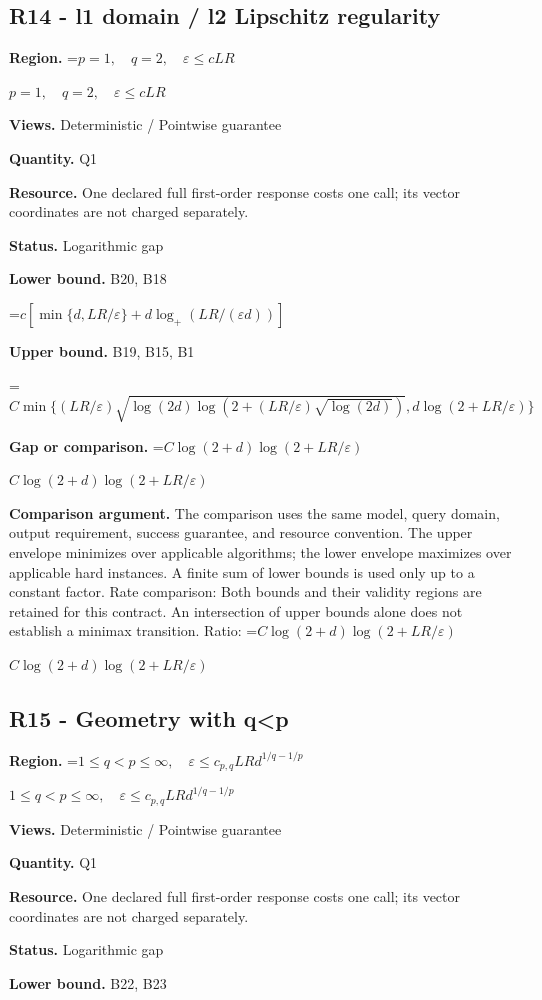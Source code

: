\documentclass[10pt,a4paper]{article}
\newcommand{\AtlasMath}[1]{\par\begingroup\centering\setbox0=\hbox{$\displaystyle #1$}\ifdim\wd0>1.4\linewidth\typeout{ATLAS WIDE FORMULA: \the\wd0}\fi\ifdim\wd0>\linewidth\resizebox{\linewidth}{!}{\box0}\else\box0\fi\par\endgroup}
\newcommand{\AtlasInlineMath}[1]{\begingroup\setbox0=\hbox{$#1$}\ifdim\wd0>.4\linewidth\endgroup\AtlasMath{#1}\else\endgroup$#1$\fi}
\begin{document}
\subsection{R14 - l1 domain / l2 Lipschitz regularity}
\textbf{Region.} \AtlasInlineMath{p=1,\quad q=2,\quad\varepsilon\le cLR}

\textbf{Views.} Deterministic / Pointwise guarantee

\textbf{Quantity.} Q1

\textbf{Resource.} One declared full first-order response costs one call; its vector coordinates are not charged separately.

\textbf{Status.} Logarithmic gap

\textbf{Lower bound.} B20, B18

\AtlasMath{c[\min\{d,LR/\varepsilon\}+d\log_+(LR/(\varepsilon d))]}
\textbf{Upper bound.} B19, B15, B1

\AtlasMath{C\min\{(LR/\varepsilon)\sqrt{\log(2d)\log(2+(LR/\varepsilon)\sqrt{\log(2d)})},d\log(2+LR/\varepsilon)\}}
\textbf{Gap or comparison.} \AtlasInlineMath{C\log(2+d)\log(2+LR/\varepsilon)}

\textbf{Comparison argument.} The comparison uses the same model, query domain, output requirement, success guarantee, and resource convention. The upper envelope minimizes over applicable algorithms; the lower envelope maximizes over applicable hard instances. A finite sum of lower bounds is used only up to a constant factor. Rate comparison: Both bounds and their validity regions are retained for this contract. An intersection of upper bounds alone does not establish a minimax transition. Ratio: \AtlasInlineMath{C\log(2+d)\log(2+LR/\varepsilon)}

\subsection{R15 - Geometry with q<p}
\textbf{Region.} \AtlasInlineMath{1\le q<p\le\infty,\quad\varepsilon\le c_{p,q}LRd^{1/q-1/p}}

\textbf{Views.} Deterministic / Pointwise guarantee

\textbf{Quantity.} Q1

\textbf{Resource.} One declared full first-order response costs one call; its vector coordinates are not charged separately.

\textbf{Status.} Logarithmic gap

\textbf{Lower bound.} B22, B23
\end{document}
